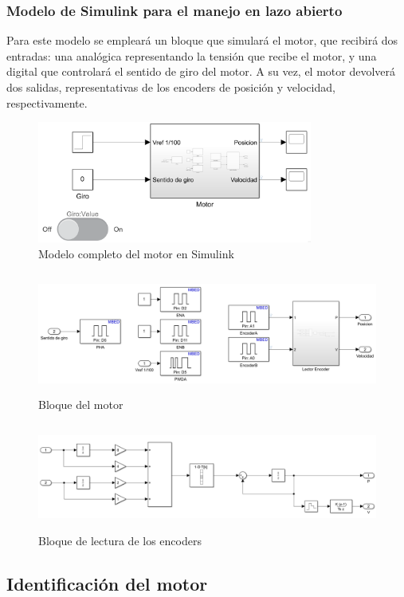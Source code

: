 \documentclass[a4paper, 12pt]{article}
\begin{document}
\subsubsection{Modelo de Simulink para el manejo en lazo abierto}
Para este modelo se empleará un bloque que simulará el motor, que recibirá dos entradas: una analógica representando la tensión que recibe el motor, y una digital que controlará el sentido de giro del motor. 
A su vez, el motor devolverá dos salidas, representativas de los encoders de posición y velocidad, respectivamente. 
\begin{figure}[h!]
	\centering
	\includegraphics[height=4cm]{figs/motorbb.png}
	\caption{Modelo completo del motor en Simulink}
\end{figure}
\begin{figure}[h!]
	\centering
	\includegraphics[height = 4cm]{figs/motorbb_inside.png}
	\caption{Bloque del motor}
\end{figure}
\begin{figure}[h!]
	\centering
	\includegraphics[height = 3.5cm]{figs/lector_encoders.png}
	\caption{Bloque de lectura de los encoders}
\end{figure}
\subsection{Identificación del motor}
\end{document}
